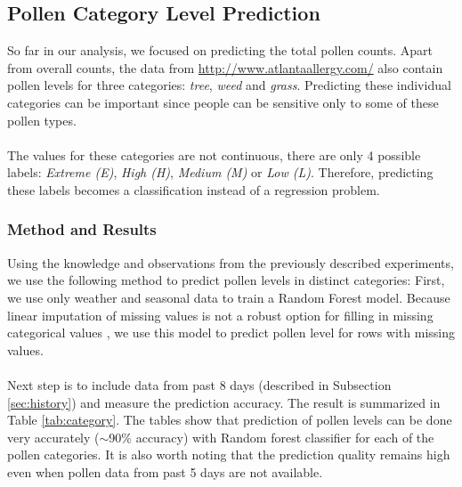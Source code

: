 \documentclass[a4paper,11pt]{article}
\begin{document}
\subsection{Pollen Category Level Prediction}
So far in our analysis, we focused on predicting the total pollen counts. Apart from overall counts, the data from \url{http://www.atlantaallergy.com/} also contain pollen levels for three categories: \emph{tree}, \emph{weed} and \emph{grass}. Predicting these individual categories can be important since people can be sensitive only to some of these pollen types.\\\\
The values for these categories are not continuous, there are only 4 possible labels: \textit{Extreme (E)}, \textit{High (H)}, \textit{Medium (M)} or \textit{Low (L)}. Therefore, predicting these labels becomes a classification instead of a regression problem.

\subsubsection*{Method and Results}
Using the knowledge and observations from the previously described experiments, we use the following method to predict pollen levels in distinct categories: First, we use only weather and seasonal data to train a Random Forest model. Because linear imputation of missing values is not a robust option for filling in missing categorical values \cite{allison2005imputation}, we use this model to predict pollen level for rows with missing values.\\\\
Next step is to include data from past 8 days (described in Subsection \ref{sec:history}) and measure the prediction accuracy. The result is summarized in Table \ref{tab:category}. The tables show that prediction of pollen levels can be done very accurately ($\sim$90\% accuracy) with Random forest classifier for each of the pollen categories. It is also worth noting that the prediction quality remains high even when pollen data from past 5 days are not available. 
\end{document}
